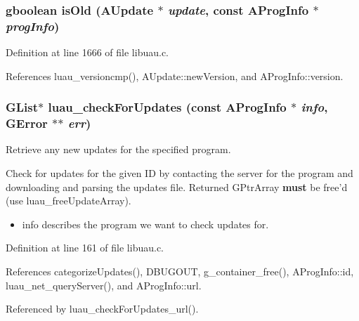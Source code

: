 \subsubsection{\setlength{\rightskip}{0pt plus 5cm}gboolean is\-Old ({\bf AUpdate} $\ast$ {\em update}, const {\bf AProg\-Info} $\ast$ {\em prog\-Info})\hspace{0.3cm}{\tt  [static]}}\label{libuau_8c_a4}




Definition at line 1666 of file libuau.c.

References luau\_\-versioncmp(), AUpdate::new\-Version, and AProg\-Info::version.
\subsubsection{\setlength{\rightskip}{0pt plus 5cm}GList$\ast$ luau\_\-check\-For\-Updates (const {\bf AProg\-Info} $\ast$ {\em info}, GError $\ast$$\ast$ {\em err})}\label{libuau_8c_a8}


Retrieve any new updates for the specified program. 

Check for updates for the given ID by contacting the server for the program and downloading and parsing the updates file. Returned GPtr\-Array {\bf must} be free'd (use luau\_\-free\-Update\-Array).

\begin{itemize}
\item info describes the program we want to check updates for. 
\end{itemize}


Definition at line 161 of file libuau.c.

References categorize\-Updates(), DBUGOUT, g\_\-container\_\-free(), AProg\-Info::id, luau\_\-net\_\-query\-Server(), and AProg\-Info::url.

Referenced by luau\_\-check\-For\-Updates\_\-url().
